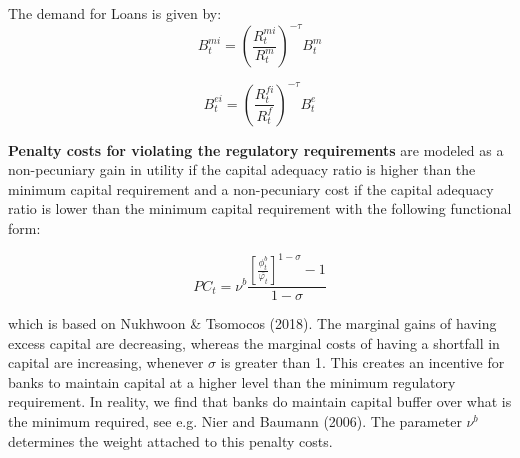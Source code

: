 \documentclass[12pt]{article}
\numberwithin{equation}{section}
\begin{document}
The demand for Loans is given by:
\begin{equation}
B^{mi}_t=(\frac{R^{mi}_t}{R^{m}_t})^{-\tau} B^{m}_t
\end{equation}

\begin{equation}
B^{ei}_t=(\frac{R^{fi}_t}{R^{f}_t})^{-\tau} B^{e}_t
\end{equation}




\textbf{Penalty costs for violating the regulatory requirements}  are modeled as a non-pecuniary gain in utility if the capital adequacy ratio is higher than the minimum capital requirement and a non-pecuniary cost if the capital adequacy ratio is lower than the minimum capital requirement with the following functional form: 

\begin{equation}
PC_t=\nu^b \frac{[\frac{\phi^b_t}{\bar{\varphi_t}}]^{1-\sigma}-1}{{1-\sigma}}
\end{equation}

which is based on Nukhwoon \& Tsomocos (2018). The marginal gains of having excess capital are decreasing, whereas the marginal costs of having a shortfall in capital are increasing, whenever $\sigma$ is greater than 1. This creates an incentive for banks to maintain capital at a higher level than the minimum regulatory requirement. In reality, we find that banks do maintain capital buffer over what is the minimum required, see e.g. Nier and Baumann (2006). The parameter $\nu^b$ determines the weight attached to this penalty costs.


\end{document}
